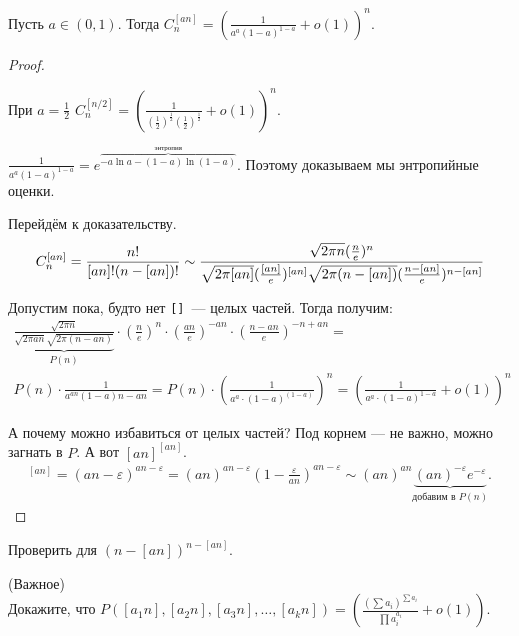 \begin{Th}
  Пусть $a \in (0, 1)$. Тогда $C_{n}^{[an]} = \left( \frac{1}{a^a(1-a)^{1-a}} + o(1) \right)^n$.
\end{Th}
\begin{proof}
  \begin{remark*}
	При $a=\frac{1}{2}$ $C^{[n/2]}_{n} = \left( \frac1{\left(\frac12 \right)^{\frac12}\left( \frac12 \right)^\frac12} + o(1) \right)^n$.
  \end{remark*}
  \begin{remark*}
	$\frac1{a^a(1-a)^{1-a}} = e^{\overbrace{-a\ln{a} - (1-a)\ln(1-a)}^{\mbox{энтропия}}}$. Поэтому доказываем мы энтропийные оценки.
  \end{remark*}

  Перейдём к доказательству.
  $$
	C_{n}^{[an]} = \frac{n!}{[an]!(n-[an])!} \sim
	\frac{\sqrt{2\pi n}(\frac{n}{e})^n}{\sqrt{2\pi [an]}(\frac{[an]}{e})^{[an]} \sqrt{2\pi (n-[an])}(\frac{n-[an]}{e})^{n-[an]}} \\
  $$

  Допустим пока, будто нет \texttt{[]}~--- целых частей. Тогда получим:
  \begin{multline*}
	\underbrace{\frac{\sqrt{2\pi n}}{\sqrt{2\pi an}\sqrt{2\pi (n-an)}}}_{P(n)} \cdot 
	\left( \frac{n}{e} \right)^n \cdot \left( \frac{an}{e} \right)^{-an} \cdot \left( \frac{n-an}{e} \right)^{-n+an} = \\
	P(n) \cdot \frac{1}{a^{an}(1-a){n-an}} = P(n) \cdot \left( \frac{1}{a^a \cdot (1-a)^(1-a)} \right)^n =
	\left( \frac{1}{a^a \cdot (1-a)^{1-a}} + o(1) \right)^n
  \end{multline*}

  А почему можно избавиться от целых частей? Под корнем --- не важно, можно загнать в $P$. А вот $[an]^{[an]}$.
  \begin{align*}
	[an]^{[an]} = (an-\varepsilon)^{an-\varepsilon} = (an)^{an-\varepsilon}(1-\frac{\varepsilon}{an})^{an-\varepsilon} \sim
	(an)^{an}\underbrace{(an)^{-\varepsilon}e^{-\varepsilon}}_{\mbox{добавим в $P(n)$}}.
  \end{align*}
\end{proof}

\begin{exercise}
  Проверить для $(n-[an])^{n-[an]}$.
\end{exercise}

\begin{exercise} (Важное) \\
  Докажите, что $P([a_1n], [a_2n], [a_3n], \ldots, [a_kn]) = \left( \frac{(\sum{a_i})^{\sum{a_i}}}{\prod{a_i^{a_i}}} + o(1)\right)$.
\end{exercise}

